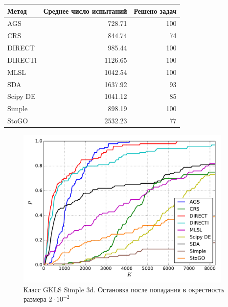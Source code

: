 \documentclass[a4paper]{article}
\begin{document}
\begin{tabular}{lrr}
\hline
 Метод    &   Среднее число испытаний &   Решено задач \\
\hline
 AGS      &                    728.71 &            100 \\
 CRS      &                    844.74 &             74 \\
 DIRECT   &                    985.44 &            100 \\
 DIRECTl  &                   1126.65 &            100 \\
 MLSL     &                   1042.54 &            100 \\
 SDA      &                   1637.92 &             93 \\
 Scipy DE &                   1041.12 &             85 \\
 Simple   &                    898.19 &            100 \\
 StoGO    &                   2532.23 &             77 \\
\hline
\end{tabular}
\begin{figure}[H]
  \center
  \includegraphics[width=0.95\textwidth]{../experiments/gklss3d/cmc.pdf}
  \caption{Класс GKLS Simple 3d. Остановка после попадания в окрестность размера $2\cdot10^{-2}$}
  \label{fig:}
\end{figure}
\end{document}
